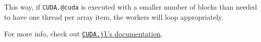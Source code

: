 \documentclass[11pt]{article}
\begin{document}
    This way, if \texttt{CUDA.@cuda} is executed with a smaller number of
blocks than needed to have one thread per array item, the workers will
loop appropriately.

For more info, check out
\href{https://juliagpu.gitlab.io/CUDA.jl}{\texttt{CUDA.jl}'s
documentation}.


    
    
    
\end{document}
